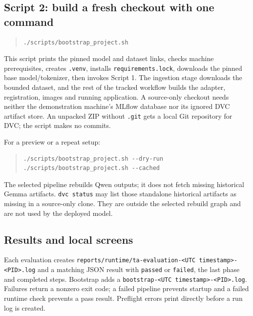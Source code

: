 \documentclass[11pt,a4paper]{article}
\begin{document}
\subsection*{Script 2: build a fresh checkout with one command}
\begin{quote}\small
\begin{verbatim}
./scripts/bootstrap_project.sh
\end{verbatim}
\end{quote}
This script prints the pinned model and dataset links, checks machine prerequisites, creates \texttt{.\allowbreak{}venv}, installs \texttt{requirements.\allowbreak{}lock}, downloads the pinned base model/tokenizer, then invokes Script 1. The ingestion stage downloads the bounded dataset, and the rest of the tracked workflow builds the adapter, registration, images and running application. A source-only checkout needs neither the demonstration machine's MLflow database nor its ignored DVC artifact store. An unpacked ZIP without \texttt{.\allowbreak{}git} gets a local Git repository for DVC; the script makes no commits.

For a preview or a repeat setup:

\begin{quote}\small
\begin{verbatim}
./scripts/bootstrap_project.sh --dry-run
./scripts/bootstrap_project.sh --cached
\end{verbatim}
\end{quote}
The selected pipeline rebuilds Qwen outputs; it does not fetch missing historical Gemma artifacts. \texttt{dvc status} may list those standalone historical artifacts as missing in a source-only clone. They are outside the selected rebuild graph and are not used by the deployed model.

\subsection*{Results and local screens}
Each evaluation creates \texttt{reports/\allowbreak{}runtime/\allowbreak{}ta-\allowbreak{}evaluation-\allowbreak{}<UTC timestamp>-\allowbreak{}<PID>.\allowbreak{}log} and a matching JSON result with \texttt{passed} or \texttt{failed}, the last phase and completed steps. Bootstrap adds a \texttt{bootstrap-\allowbreak{}<UTC timestamp>-\allowbreak{}<PID>.\allowbreak{}log}. Failures return a nonzero exit code; a failed pipeline prevents startup and a failed runtime check prevents a pass result. Preflight errors print directly before a run log is created.
\end{document}
